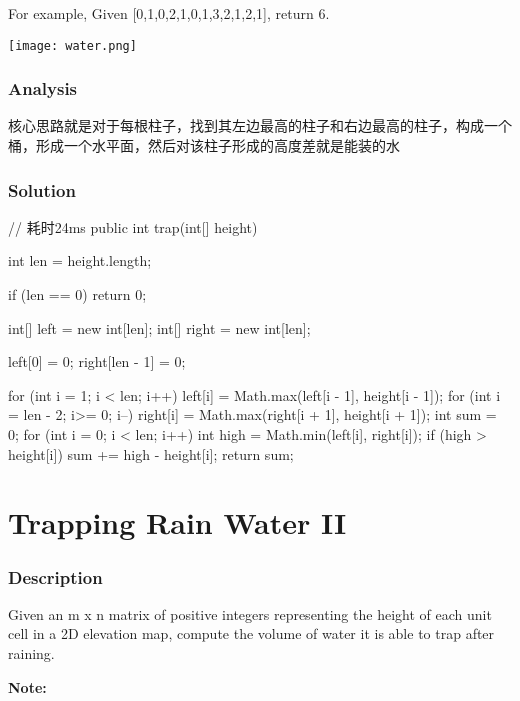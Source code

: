 For example,
Given [0,1,0,2,1,0,1,3,2,1,2,1], return 6.

\begin{center}
\texttt{[image: water.png]}\\
\end{center}

\subsubsection{Analysis}
核心思路就是对于每根柱子，找到其左边最高的柱子和右边最高的柱子，构成一个桶，形成一个水平面，然后对该柱子形成的高度差就是能装的水

\subsubsection{Solution}

\begin{Code}
// 耗时24ms
public int trap(int[] height) {
    int len = height.length;

    if (len == 0) {
        return 0;
    }

    int[] left = new int[len];
    int[] right = new int[len];

    left[0] = 0;
    right[len - 1] = 0;

    for (int i = 1; i < len; i++) {
        left[i] = Math.max(left[i - 1], height[i - 1]);
    }
    for (int i = len - 2; i>= 0; i--) {
        right[i] = Math.max(right[i + 1], height[i + 1]);
    }
    int sum = 0;
    for (int i = 0; i < len; i++) {
        int high = Math.min(left[i], right[i]);
        if (high > height[i]) {
            sum += high - height[i];
        }
    }
    return sum;
}
\end{Code}

\newpage

\section{Trapping Rain Water II} %

\subsubsection{Description}
Given an m x n matrix of positive integers representing the height of each unit cell in a 2D elevation map, compute the volume of water it is able to trap after raining.

\textbf{Note:}

